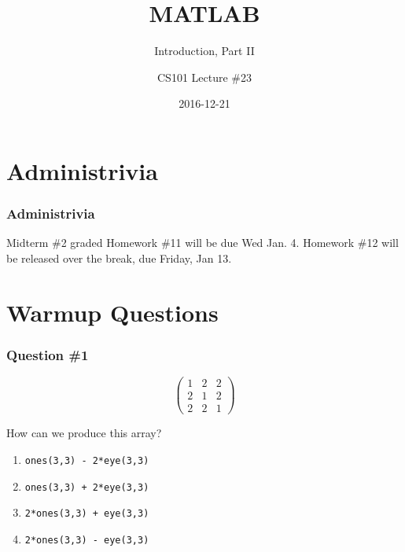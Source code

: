 \documentclass[11pt]{beamer}
\title{MATLAB}
\subtitle{Introduction, Part II}
\author{CS101 Lecture \#23}
\date{2016-12-21}
\begin{document}
  \setcounter{showProgressBar}{0}
  \setcounter{showSlideNumbers}{0}

\frame{\titlepage}

\setcounter{framenumber}{0}
\setcounter{showProgressBar}{1}
\setcounter{showSlideNumbers}{1}

\section{Administrivia}

\begin{frame}
  \frametitle{Administrivia}
  \Enlarge

  \begin{itemize}
  \myitem  Midterm \#2 graded
  \myitem  Homework \#11 will be  due Wed Jan. 4.  \pause
  \myitem  Homework \#12 will be released over the break, due Friday, Jan 13. 
  \end{itemize}
\end{frame}

\section{Warmup Questions}

\begin{frame}[fragile]
  \frametitle{Question \#1}
  \Enlarge
$$
\left(
\begin{array}{ccc}
1 & 2 & 2 \\
2 & 1 & 2 \\
2 & 2 & 1
\end{array}
\right)
$$

How can we produce this array?

  \begin{enumerate}[label=\Alph*]
    \item  \texttt{ones(3,3) - 2*eye(3,3)}
    \item  \texttt{ones(3,3) + 2*eye(3,3)}
    \item  \texttt{2*ones(3,3) + eye(3,3)}
    \item  \texttt{2*ones(3,3) - eye(3,3)}
  \end{enumerate}
\end{frame}
\end{document}
